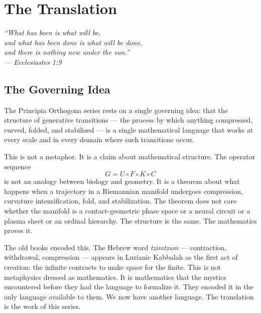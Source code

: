 \cleardoublepage


\chapter{The Translation}
\label{ch:translation}

\begin{center}
\itshape
``What has been is what will be,\\
and what has been done is what will be done,\\
and there is nothing new under the sun.''\\[0.5em]
\normalfont\small --- Ecclesiastes 1:9
\end{center}

\vspace{0.5cm}

\section{The Governing Idea}
\label{sec:governing-idea}

\noindent The Principia Orthogona series rests on a single governing
idea: that the structure of generative transitions --- the process
by which anything compressed, curved, folded, and stabilized ---
is a single mathematical language that works at every scale and in
every domain where such transitions occur.

This is not a metaphor. It is a claim about mathematical structure.
The operator sequence
\[
G = U \circ F \circ K \circ C
\]
is not an analogy between biology and geometry. It is a theorem
about what happens when a trajectory in a Riemannian manifold
undergoes compression, curvature intensification, fold, and
stabilization. The theorem does not care whether the manifold
is a contact-geometric phase space or a neural circuit or a
plasma sheet or an ordinal hierarchy. The structure is the
same. The mathematics proves it.

The old books encoded this. The Hebrew word \textit{tzimtzum} ---
contraction, withdrawal, compression --- appears in Lurianic
Kabbalah as the first act of creation: the infinite contracts
to make space for the finite. This is not metaphysics dressed
as mathematics. It is mathematics that the mystics encountered
before they had the language to formalize it. They encoded it
in the only language available to them. We now have another
language. The translation is the work of this series.

